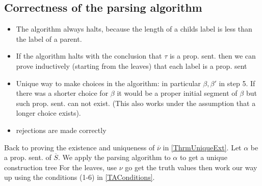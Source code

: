 \subsection*{Correctness of the parsing algorithm}
\begin{itemize}
    \item The algorithm always halts, because the length of a childs label is less than the label of a parent.
    \item If the algorithm halts with the conclusion that $\tau$ is a prop. sent. 
    then we can prove inductively (starting from the leaves) that each label is a prop. sent
    \item Unique way to make choices in the algorithm: in particular $\beta, \beta'$ in step 5.
    If there was a shorter choice for $\beta$ it would be a proper initial segment of $\beta$ but such prop. sent. can not exist.
    (This also works under the assumption that a longer choice exists).
    \item rejections are made correctly
\end{itemize}



Back to proving the existence and uniqueness of $\overline{\nu}$ in \ref{ThrmUniqueExt}.
Let $\alpha$ be a prop. sent. of $\overline{S}$. We apply the parsing algorithm to $\alpha$ to get a unique construction tree
For the leaves, use $\nu$ go get the truth values then work our way up using the conditions (1-6) in \ref{TAConditions}.
